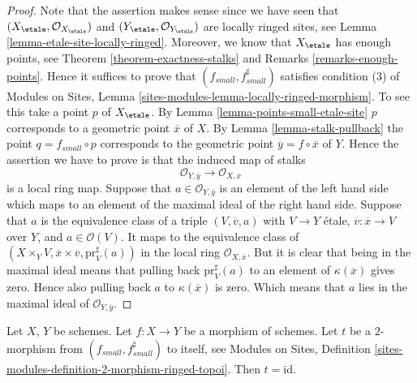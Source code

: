 \begin{proof}
Note that the assertion makes sense since we have seen that
$(X_\etale, \mathcal{O}_{X_\etale})$ and
$(Y_\etale, \mathcal{O}_{Y_\etale})$
are locally ringed sites, see
Lemma \ref{lemma-etale-site-locally-ringed}.
Moreover, we know that $X_\etale$ has enough points, see
Theorem \ref{theorem-exactness-stalks}
and
Remarks \ref{remarks-enough-points}.
Hence it suffices to prove that $(f_{small}, f_{small}^\sharp)$
satisfies condition (3) of
Modules on Sites,
Lemma \ref{sites-modules-lemma-locally-ringed-morphism}.
To see this take a point $p$ of $X_\etale$. By
Lemma \ref{lemma-points-small-etale-site}
$p$ corresponds to a geometric point $\overline{x}$ of $X$.
By
Lemma \ref{lemma-stalk-pullback}
the point $q = f_{small} \circ p$ corresponds to the
geometric point $\overline{y} = f \circ \overline{x}$ of $Y$.
Hence the assertion we have to prove is that the induced map
of stalks
$$
\mathcal{O}_{Y, \overline{y}} \longrightarrow \mathcal{O}_{X, \overline{x}}
$$
is a local ring map. Suppose that $a \in \mathcal{O}_{Y, \overline{y}}$
is an element of the left hand side which maps to an element of the maximal
ideal of the right hand side. Suppose that $a$ is the equivalence class
of a triple $(V, \overline{v}, a)$ with $V \to Y$ \'etale,
$\overline{v} : \overline{x} \to V$ over $Y$, and $a \in \mathcal{O}(V)$.
It maps to the equivalence class of
$(X \times_Y V, \overline{x} \times \overline{v}, \text{pr}_V^\sharp(a))$
in the local ring $\mathcal{O}_{X, \overline{x}}$. But it is clear that
being in the maximal ideal means that pulling back $\text{pr}_V^\sharp(a)$
to an element of $\kappa(\overline{x})$ gives zero. Hence also pulling back
$a$ to $\kappa(\overline{x})$ is zero. Which means that $a$ lies in the
maximal ideal of $\mathcal{O}_{Y, \overline{y}}$.
\end{proof}

\begin{lemma}
\label{lemma-2-morphism}
Let $X$, $Y$ be schemes. Let $f : X \to Y$ be a morphism of schemes.
Let $t$ be a $2$-morphism from $(f_{small}, f_{small}^\sharp)$ to itself, see
Modules on Sites,
Definition \ref{sites-modules-definition-2-morphism-ringed-topoi}.
Then $t = \text{id}$.
\end{lemma}

